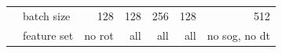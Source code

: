 \begin{table}[h]
\begin{tabular}{llrrrrr}
                           & batch size            & 128   & 128   & 256   & 128   & 512   \\
                           & feature set           & no rot   & all   & all   & all   & no sog, no dt \\
            \bottomrule
            \end{tabular}%
            \end{table}
            
